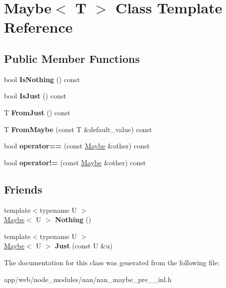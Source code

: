 \hypertarget{class_maybe}{}\section{Maybe$<$ T $>$ Class Template Reference}
\label{class_maybe}
\subsection*{Public Member Functions}
\begin{DoxyCompactItemize}
\item 
\mbox{\label{class_maybe_aa8f46f03b106785b4ee59535a017ef7e}} 
bool {\bfseries Is\+Nothing} () const
\item 
\mbox{\label{class_maybe_ae70586d13c0f21e4c12d4d387da705cf}} 
bool {\bfseries Is\+Just} () const
\item 
\mbox{\label{class_maybe_a81ee044a9128600d59cfe69612f238df}} 
T {\bfseries From\+Just} () const
\item 
\mbox{\label{class_maybe_af7e389cef2fec7d6928ce3350e4fbc24}} 
T {\bfseries From\+Maybe} (const T \&default\+\_\+value) const
\item 
\mbox{\label{class_maybe_abf11df8d59c17bdcdd2b976115a95901}} 
bool {\bfseries operator==} (const \hyperlink{class_maybe}{Maybe} \&other) const
\item 
\mbox{\label{class_maybe_abba962972e7d993bfcdb236dc884a527}} 
bool {\bfseries operator!=} (const \hyperlink{class_maybe}{Maybe} \&other) const
\end{DoxyCompactItemize}
\subsection*{Friends}
\begin{DoxyCompactItemize}
\item 
\mbox{\label{class_maybe_aeb9593e125b42d748acbd69b72c89f37}} 
{\footnotesize template$<$typename U $>$ }\\\hyperlink{class_maybe}{Maybe}$<$ U $>$ {\bfseries Nothing} ()
\item 
\mbox{\label{class_maybe_aeff0e7fedd63cfebe9a5286e2cd8552d}} 
{\footnotesize template$<$typename U $>$ }\\\hyperlink{class_maybe}{Maybe}$<$ U $>$ {\bfseries Just} (const U \&u)
\end{DoxyCompactItemize}


The documentation for this class was generated from the following file\+:\begin{DoxyCompactItemize}
\item 
app/web/node\+\_\+modules/nan/nan\+\_\+maybe\+\_\+pre\+\_\+\_\+inl.\+h\end{DoxyCompactItemize}
